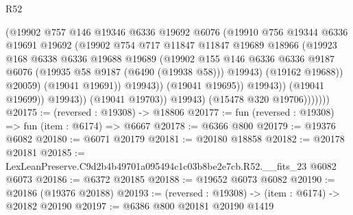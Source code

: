 \begin{lexlean}{R52}
\begin{coremodule}
                                  (@19902
                                    @757
                                    @146
                                    @19346
                                    @6336
                                    @19692
                                    @6076
                                    (@19910
                                      @756
                                      @19344
                                      @6336
                                      @19691
                                      @19692
                                      (@19902
                                        @754
                                        @717
                                        @11847
                                        @11847
                                        @19689
                                        @18966
                                        (@19923
                                          @168
                                          @6338
                                          @6336
                                          @19688
                                          @19689
                                          (@19902
                                            @155
                                            @146
                                            @6336
                                            @6336
                                            @9187
                                            @6076
                                            (@19935 @58 @9187 (@6490 (@19938 @58)))
                                            @19943)
                                          (@19162 @19688))
                                        @20059)
                                      (@19041 @19691))
                                    @19943))
                                (@19041 @19695))
                              @19943))
                          (@19041 @19699))
                        @19943))
                    (@19041 @19703))
                  @19943)
                (@15478 @320 @19706)))))))
@20175 := (reversed : @19308) -> @18806
@20177 := fun (reversed : @19308) => fun (item : @6174) => @6667
@20178 := @6366 @800
@20179 := @19376 @6082
@20180 := @6071 @20179
@20181 := @20180 @18858
@20182 := @20178 @20181
@20185 := LexLeanPreserve.C9d2b4b49701a095494c1c03b8be2e7cb.R52.__fits_23 @6082 @6073
@20186 := @6372 @20185
@20188 := @19652 @6073 @6082
@20190 := @20186 (@19376 @20188)
@20193 := (reversed : @19308) -> (item : @6174) -> @20182 @20190
@20197 := @6386 @800 @20181 @20190 @1419

\end{coremodule}
\end{lexlean}
